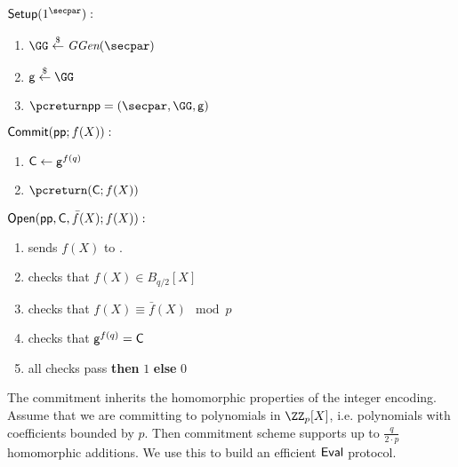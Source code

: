 \documentclass{article}
\theoremstyle{definition}
\begin{document}
\begin{mdframed}[userdefinedwidth=\textwidth]
\begin{minipage}{\textwidth}
	\begin{flushleft}
	$\pro{Setup}(1^\secpar):$
		\begin{enumerate}[nolistsep]
			\item $ \GG \sample \ggen(\secpar)$
			\item $ \gr{g} \sample \GG$
			\item $\pcreturn \params = (\secpar,\GG,\gr{g})$
		\end{enumerate}
	$\textsf{{Commit}}(\textsf{pp};f(X)):$ 
		\begin{enumerate}[nolistsep]
			\item $\mathsf{C} \gets \mathsf{g}^{f(q)}$
			\item $\pcreturn (\gr{C};f(X))$
		\end{enumerate}
	$\textsf{{Open}}(\textsf{pp},\mathsf{C},\bar{f}(X);f(X)):$ 
		\begin{enumerate}[nolistsep]
		    \item \prover sends $f(X)$ to \verifier.
		    \item \verifier checks that $f(X)\in B_{q/2}[X]$
				\item \verifier checks that $f(X) \equiv \bar{f}(X) \mod p$
			\item \verifier checks that $\mathsf{g}^{f(q)} = \mathsf{C}$
			\item \pcif all checks pass \textbf{then} \pcreturn $1$ \textbf{else} \pcreturn $0$
		\end{enumerate}
		\end{flushleft}
\end{minipage}
\end{mdframed}
The commitment inherits the homomorphic properties of the integer encoding. Assume that we are committing to polynomials in $\ZZ_p[X]$, i.e. polynomials with coefficients bounded by $p$. Then commitment scheme supports up to $\frac{q}{2 \cdot p}$ homomorphic additions. We use this to build an efficient $\textsf{{Eval}}$ protocol. 
\end{document}
